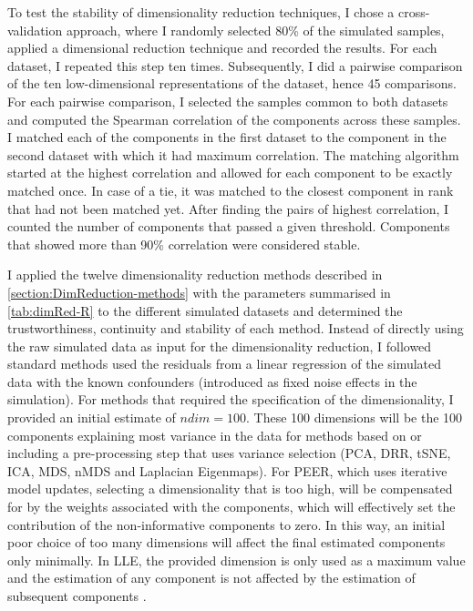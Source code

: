 To test the stability of dimensionality reduction techniques, I chose a cross-validation approach, where I randomly selected \num{80}\% of the simulated samples, applied a dimensional reduction technique and recorded the results. For each dataset, I repeated this step ten times. Subsequently, I did a pairwise comparison of the ten low-dimensional representations of the dataset, hence \num{45} comparisons. For each pairwise comparison, I selected the samples common to both datasets and computed the Spearman correlation of the components across these samples. I matched each of the components in the first dataset to the component in the second dataset with which it had maximum correlation. The matching algorithm started at the highest correlation and allowed for each component to be exactly matched once. In case of a tie, it was matched to the closest component in rank that had not been matched yet. After finding the pairs of highest correlation, I counted the number of components that passed a given threshold. Components that showed more than \num{90}\% correlation were considered stable. 

I applied the twelve dimensionality reduction methods described in \cref{section:DimReduction-methods} with the parameters summarised in \cref{tab:dimRed-R} to the different simulated datasets and determined the trustworthiness, continuity and stability of each method.  Instead of directly using the raw simulated data as input for the dimensionality reduction, I followed standard methods used the residuals from a linear regression of the simulated data with the known confounders (introduced as fixed noise effects in the simulation).  For methods that required the specification of the dimensionality, I provided an initial estimate of \(ndim=100\).  These \num{100} dimensions will be the \num{100} components explaining most variance in the data for methods based on or including a pre-processing step that uses variance selection (PCA, DRR, tSNE, ICA, MDS, nMDS and Laplacian Eigenmaps). For PEER, which uses iterative model updates, selecting a dimensionality that is too high, will be compensated for by the weights associated with the components, which will effectively set the contribution of the non-informative components to  zero. In this way, an initial poor choice of too many dimensions will affect the final estimated components only minimally. In LLE, the provided dimension is only used as a maximum value and the estimation of any component is not affected by the estimation of subsequent components \citep{Roweis2000,Kayo2006}.

